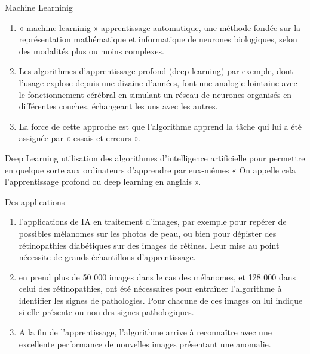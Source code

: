 \begin{frame}{Machine Learninig}
    \begin{enumerate}[<+-|alert@+>][$\blacksquare$]
        \item
        « machine learninig » apprentissage automatique, une méthode fondée sur
        la représentation mathématique et informatique de neurones
        biologiques, selon des modalités plus ou moins complexes.

        \item
        Les algorithmes d'apprentissage profond (deep learning) par exemple, dont
        l'usage explose depuis une dizaine d'années, font une analogie
        lointaine avec le fonctionnement cérébral en simulant un réseau de
        neurones organisés en différentes couches, échangeant les uns avec les
        autres.

        \item
        La force de cette approche est que l'algorithme apprend la
        tâche qui lui a été assignée par « essais et erreurs ».
    \end{enumerate}
\end{frame}

\begin{frame}{Deep Learning}
    utilisation des algorithmes d'intelligence artificielle pour permettre
    en quelque sorte aux ordinateurs d'apprendre par eux-mêmes « On
    appelle cela l'apprentissage profond ou deep learning en anglais ».
\end{frame}

\begin{frame}{Des applications}
    \begin{enumerate}[<+-|alert@+>][$\blacksquare$]
        \item
        l'applications de IA en traitement d'images, par exemple pour repérer de
        possibles mélanomes sur les photos de peau, ou bien pour dépister des
        rétinopathies diabétiques sur des images de rétines. Leur mise au point
        nécessite de grands échantillons d'apprentissage.
        \item
        en prend plus de 50 000 images dans le cas des mélanomes, et 128 000
        dans celui des rétinopathies, ont été nécessaires pour entraîner
        l'algorithme à identifier les signes de pathologies. Pour chacune
        de ces images on lui indique si elle présente ou non des signes
        pathologiques.
        \item
        A la fin de l'apprentissage, l'algorithme arrive à
        reconnaître avec une excellente performance de nouvelles images
        présentant une anomalie. 
    \end{enumerate}
\end{frame}


